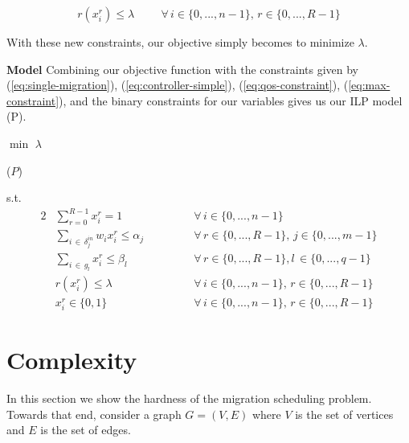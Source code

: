 \documentclass[letterpaper,12pt,titlepage,oneside,final]{article}
\let\oldcenter\center
\let\oldendcenter\endcenter
\renewenvironment{center}{\setlength\topsep{0pt}\oldcenter}{\oldendcenter}
\begin{document}
\begin{equation}\label{eq:max-constraint}
    r(x^{r}_{i}) \leq \lambda \hspace{1cm} \forall \, i \in \{0, ..., n-1\}, \, r \in \{0, ..., R - 1\}
\end{equation}

With these new constraints, our objective simply becomes to minimize $\lambda$.\newline

\noindent\textbf{Model}\newline
\noindent Combining our objective function with the constraints given by (\ref{eq:single-migration}), (\ref{eq:controller-simple}), (\ref{eq:qos-constraint}), (\ref{eq:max-constraint}), and the binary constraints for our variables gives us our ILP model (P).\newline
\newpage

\begin{minipage}{0.8\textwidth}
\begin{center}
    $\min$ $\lambda$
\end{center}
\end{minipage}
\begin{minipage}{0.15\textwidth}
\begin{center}
    ($P$)
\end{center}
\end{minipage}
s.t.
\begin{center}
    \begin{alignat*}{2}
        &\sum_{r=0}^{R-1} x^{r}_{i} = 1 \hspace{2cm} &&\forall \, i \in \{0, ..., n-1\} \\
        &\sum_{i \, \in \, \delta^{in}_{j}} w_{i}x^{r}_{i} \leq \alpha_{j} &&\forall \, r \in \{0, ..., R-1\}, \, j \in \{0, ..., m-1\}\\
        &\sum_{i \, \in \, g_{l}} x^{r}_{i} \leq \beta_{l} &&\forall \, r \in \{0, ..., R-1\}, l\,  \in \{0, ..., q-1\}\\
        &r(x^{r}_{i}) \leq \lambda &&\forall \, i \in \{0, ..., n - 1\}, \, r \in \{0, ..., R - 1\}\\
        &x^{r}_{i} \in \{0, 1\} &&\forall \, i \in \{0, ..., n - 1\}, \, r \in \{0, ..., R - 1\}
    \end{alignat*}
\end{center}

\section{Complexity}
In this section we show the hardness of the migration scheduling problem. Towards that end, consider a graph $G=(V, E)$ where $V$ is the set of vertices and $E$ is the set of edges. 
\end{document}
